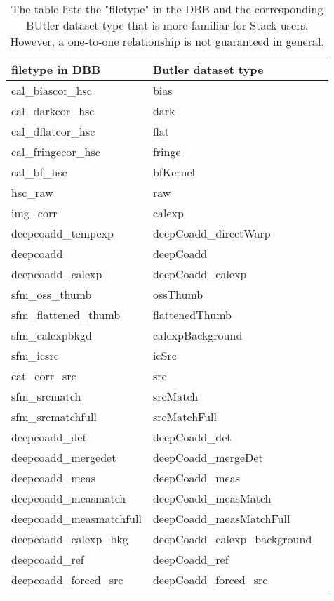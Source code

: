 \begin{longtable}{l|ll} \label{tab:name}
 filetype in DBB & Butler dataset type \\
\hline
 cal{\_}biascor{\_}hsc & bias  \\
 cal{\_}darkcor{\_}hsc & dark  \\
 cal{\_}dflatcor{\_}hsc & flat  \\
 cal{\_}fringecor{\_}hsc & fringe  \\
 cal{\_}bf{\_}hsc & bfKernel  \\
 hsc{\_}raw & raw \\
 img{\_}corr & calexp \\
 deepcoadd{\_}tempexp & deepCoadd{\_}directWarp \\
 deepcoadd & deepCoadd  \\
 deepcoadd{\_}calexp & deepCoadd{\_}calexp  \\
 sfm{\_}oss{\_}thumb & ossThumb \\
 sfm{\_}flattened{\_}thumb & flattenedThumb \\
 sfm{\_}calexpbkgd & calexpBackground \\
 sfm{\_}icsrc & icSrc \\
 cat{\_}corr{\_}src & src  \\
 sfm{\_}srcmatch & srcMatch \\
 sfm{\_}srcmatchfull & srcMatchFull \\
 deepcoadd{\_}det & deepCoadd{\_}det  \\
 deepcoadd{\_}mergedet & deepCoadd{\_}mergeDet  \\
 deepcoadd{\_}meas & deepCoadd{\_}meas  \\
 deepcoadd{\_}measmatch & deepCoadd{\_}measMatch  \\
 deepcoadd{\_}measmatchfull & deepCoadd{\_}measMatchFull  \\
 deepcoadd{\_}calexp{\_}bkg & deepCoadd{\_}calexp{\_}background  \\
 deepcoadd{\_}ref & deepCoadd{\_}ref  \\
 deepcoadd{\_}forced{\_}src & deepCoadd{\_}forced{\_}src  \\
\caption{The table lists the "filetype" in the DBB and the corresponding BUtler dataset type that is more familiar for Stack users. However, a one-to-one relationship is not guaranteed in general.}
\end{longtable}
